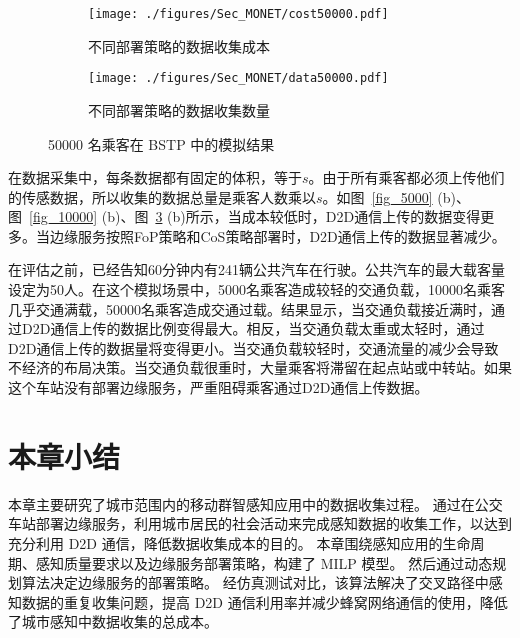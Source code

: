 \begin{figure}[!h]
  \centering
  \begin{subfigure}[b]{0.45\linewidth}
    \texttt{[image: ./figures/Sec\_MONET/cost50000.pdf]}
    \label{fig_cost50000}
    \vspace{-2em}
    \caption{不同部署策略的数据收集成本}
  \end{subfigure}
  \begin{subfigure}[b]{0.45\linewidth}
    \texttt{[image: ./figures/Sec\_MONET/data50000.pdf]}
    \label{fig_data50000}
    \vspace{-2em}
    \caption{不同部署策略的数据收集数量}
  \end{subfigure}
    \vspace{-0.5em}
    \caption{50000 名乘客在 BSTP 中的模拟结果}
  \label{fig_50000}
\end{figure}

在数据采集中，每条数据都有固定的体积，等于$s$。由于所有乘客都必须上传他们的传感数据，所以收集的数据总量是乘客人数乘以$s$。如图~\ref{fig_5000} (b)、图~\ref{fig_10000} (b)、图~\ref{fig_50000} (b)所示，当成本较低时，D2D通信上传的数据变得更多。当边缘服务按照FoP策略和CoS策略部署时，D2D通信上传的数据显著减少。

在评估之前，已经告知60分钟内有241辆公共汽车在行驶。公共汽车的最大载客量设定为50人。在这个模拟场景中，5000名乘客造成较轻的交通负载，10000名乘客几乎交通满载，50000名乘客造成交通过载。结果显示，当交通负载接近满时，通过D2D通信上传的数据比例变得最大。相反，当交通负载太重或太轻时，通过D2D通信上传的数据量将变得更小。当交通负载较轻时，交通流量的减少会导致不经济的布局决策。当交通负载很重时，大量乘客将滞留在起点站或中转站。如果这个车站没有部署边缘服务，严重阻碍乘客通过D2D通信上传数据。

\section{本章小结}

本章主要研究了城市范围内的移动群智感知应用中的数据收集过程。
通过在公交车站部署边缘服务，利用城市居民的社会活动来完成感知数据的收集工作，以达到充分利用 D2D 通信，降低数据收集成本的目的。
本章围绕感知应用的生命周期、感知质量要求以及边缘服务部署策略，构建了 MILP 模型。
然后通过动态规划算法决定边缘服务的部署策略。
经仿真测试对比，该算法解决了交叉路径中感知数据的重复收集问题，提高 D2D 通信利用率并减少蜂窝网络通信的使用，降低了城市感知中数据收集的总成本。

